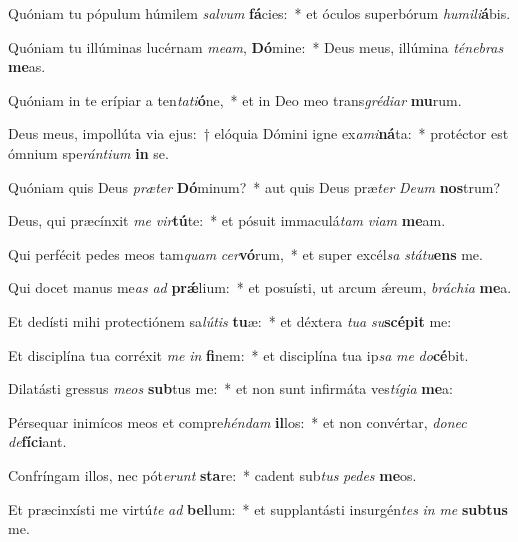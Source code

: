 \item Quóniam tu pópulum húmilem \textit{sal}\textit{vum} \textbf{fá}cies:~* et óculos superbórum \textit{hu}\textit{mi}\textit{li}\textbf{á}bis.
\item Quóniam tu illúminas lucérnam \textit{me}\textit{am}, \textbf{Dó}mine:~* Deus meus, illúmina \textit{té}\textit{ne}\textit{bras} \textbf{me}as.
\item Quóniam in te erípiar a ten\textit{ta}\textit{ti}\textbf{ó}ne,~* et in Deo meo trans\textit{gré}\textit{di}\textit{ar} \textbf{mu}rum.
\item Deus meus, impollúta via ejus:~† elóquia Dómini igne ex\textit{a}\textit{mi}\textbf{ná}ta:~* protéctor est ómnium spe\textit{rán}\textit{ti}\textit{um} \textbf{in} se.
\item Quóniam quis Deus \textit{præ}\textit{ter} \textbf{Dó}minum?~* aut quis Deus præ\textit{ter} \textit{De}\textit{um} \textbf{nos}trum?
\item Deus, qui præcínxit \textit{me} \textit{vir}\textbf{tú}te:~* et pósuit immaculá\textit{tam} \textit{vi}\textit{am} \textbf{me}am.
\item Qui perfécit pedes meos tam\textit{quam} \textit{cer}\textbf{vó}rum,~* et super excél\textit{sa} \textit{stá}\textit{tu}\textbf{ens} me.
\item Qui docet manus me\textit{as} \textit{ad} \textbf{prǽ}lium:~* et posuísti, ut arcum ǽreum, \textit{brá}\textit{chi}\textit{a} \textbf{me}a.
\item Et dedísti mihi protectiónem sa\textit{lú}\textit{tis} \textbf{tu}æ:~* et déxtera \textit{tu}\textit{a} \textit{su}\textbf{scé}\textbf{pit} me:
\item Et disciplína tua corréxit \textit{me} \textit{in} \textbf{fi}nem:~* et disciplína tua ip\textit{sa} \textit{me} \textit{do}\textbf{cé}bit.
\item Dilatásti gressus \textit{me}\textit{os} \textbf{sub}tus me:~* et non sunt infirmáta ves\textit{tí}\textit{gi}\textit{a} \textbf{me}a:
\item Pérsequar inimícos meos et compre\textit{hén}\textit{dam} \textbf{il}los:~* et non convértar, \textit{do}\textit{nec} \textit{de}\textbf{fí}\textbf{ci}ant.
\item Confríngam illos, nec pót\textit{e}\textit{runt} \textbf{sta}re:~* cadent sub\textit{tus} \textit{pe}\textit{des} \textbf{me}os.
\item Et præcinxísti me virtú\textit{te} \textit{ad} \textbf{bel}lum:~* et supplantásti insurgén\textit{tes} \textit{in} \textit{me} \textbf{sub}\textbf{tus} me.
